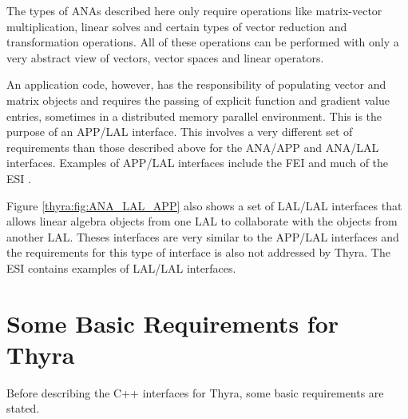 \documentclass[pdf,ps2pdf,11pt]{SANDreport}
\begin{document}
The types of ANAs described here only require operations like matrix-vector
multiplication, linear solves and certain types of vector reduction and
transformation operations.  All of these operations can be performed with only
a very abstract view of vectors, vector spaces and linear operators.

An application code, however, has the responsibility of populating vector and
matrix objects and requires the passing of explicit function and gradient
value entries, sometimes in a distributed memory parallel environment.  This
is the purpose of an APP/LAL interface.  This involves a very different set of
requirements than those described above for the ANA/APP and ANA/LAL
interfaces.  Examples of APP/LAL interfaces include the FEI {}\cite{ref:fei}
and much of the ESI {}\cite{ref:esi_2001}.

Figure {}\ref{thyra:fig:ANA_LAL_APP} also shows a set of LAL/LAL interfaces
that allows linear algebra objects from one LAL to collaborate with the
objects from another LAL.  Theses interfaces are very similar to the APP/LAL
interfaces and the requirements for this type of interface is also not
addressed by Thyra.  The ESI {}\cite{ref:esi_2001} contains examples of
LAL/LAL interfaces.


%
\section{Some Basic Requirements for Thyra}
\label{thyra:sec:Thyra_requirements}
%

Before describing the C++ interfaces for Thyra, some basic requirements are
stated.
\end{document}
